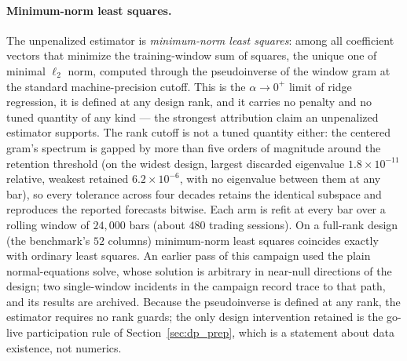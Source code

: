 \paragraph{Minimum-norm least squares.} The unpenalized estimator is
\emph{minimum-norm least squares}: among all coefficient vectors that
minimize the training-window sum of squares, the unique one of minimal
$\ell_2$ norm, computed through the pseudoinverse of the window gram at
the standard machine-precision cutoff. This is the $\alpha \to 0^{+}$
limit of ridge regression, it is defined at any design rank, and it
carries no penalty and no tuned quantity of any kind --- the strongest
attribution claim an unpenalized estimator supports. The rank cutoff is
not a tuned quantity either: the centered gram's spectrum is gapped by
more than five orders of magnitude around the retention threshold (on
the widest design, largest discarded eigenvalue $1.8 \times 10^{-11}$
relative, weakest retained $6.2 \times 10^{-6}$, with no eigenvalue
between them at any bar), so every tolerance across four decades retains
the identical subspace and reproduces the reported forecasts bitwise. Each arm is refit at
every bar over a rolling window of $24{,}000$ bars (about $480$ trading
sessions).
On a full-rank design (the benchmark's $52$ columns) minimum-norm least
squares coincides exactly with ordinary least squares. An earlier pass of
this campaign used the plain normal-equations solve, whose solution is
arbitrary in near-null directions of the design; two single-window
incidents in the campaign record trace to that path, and
its results are archived. Because the pseudoinverse is defined at any
rank, the estimator requires no rank guards; the only design
intervention retained is the go-live participation rule of
Section~\ref{sec:dp_prep}, which is a statement about data existence,
not numerics.\par\endgroup

